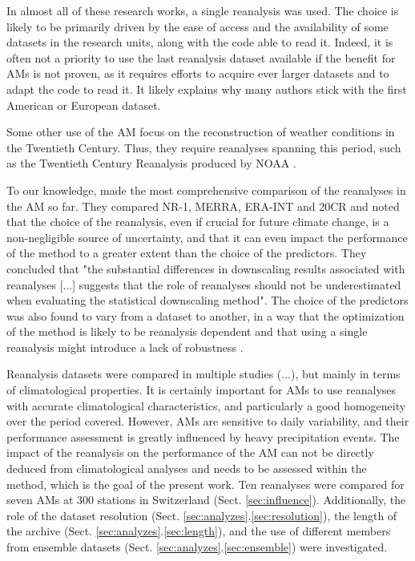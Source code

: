 \documentclass{ametsoc}
\begin{document}
In almost all of these research works, a single reanalysis was used. The choice is likely to be primarily driven by the ease of access and the availability of some datasets in the research units, along with the code able to read it. Indeed, it is often not a priority to use the last reanalysis dataset available if the benefit for AMs is not proven, as it requires efforts to acquire ever larger datasets and to adapt the code to read it. It likely explains why many authors stick with the first American or European dataset.

Some other use of the AM focus on the reconstruction of weather conditions in the Twentieth Century. Thus, they require reanalyses spanning this period, such as the Twentieth Century Reanalysis \citep[20CR][]{Compo2011} produced by NOAA \citep[for example,][]{Kuentz2015, Caillouet2016, Brigode2016}. 

To our knowledge, \citet{Dayon2015} made the most comprehensive comparison of the reanalyses in the AM so far. They compared NR-1, MERRA, ERA-INT and 20CR and noted that the choice of the reanalysis, even if crucial for future climate change, is a non-negligible source of uncertainty, and that it can even impact the performance of the method to a greater extent than the choice of the predictors. They concluded that "the substantial differences in downscaling results associated with reanalyses [...] suggests that the role of reanalyses should not be underestimated when evaluating the statistical downscaling method". The choice of the predictors was also found to vary from a dataset to another, in a way that the optimization of the method is likely to be reanalysis dependent and that using a single reanalysis might introduce a lack of robustness \citep{Dayon2015}.

Reanalysis datasets were compared in multiple studies (...), but mainly in terms of climatological properties. It is certainly important for AMs to use reanalyses with accurate climatological characteristics, and particularly a good homogeneity over the period covered. However, AMs are sensitive to daily variability, and their performance assessment is greatly influenced by heavy precipitation events. The impact of the reanalysis on the performance of the AM can not be directly deduced from climatological analyses and needs to be assessed within the method, which is the goal of the present work. Ten reanalyses were compared for seven AMs at 300 stations in Switzerland (Sect. \ref{sec:influence}). Additionally, the role of the dataset resolution (Sect. \ref{sec:analyzes}.\ref{sec:resolution}), the length of the archive (Sect. \ref{sec:analyzes}.\ref{sec:length}), and the use of different members from ensemble datasets (Sect. \ref{sec:analyzes}.\ref{sec:ensemble}) were investigated.
\end{document}
